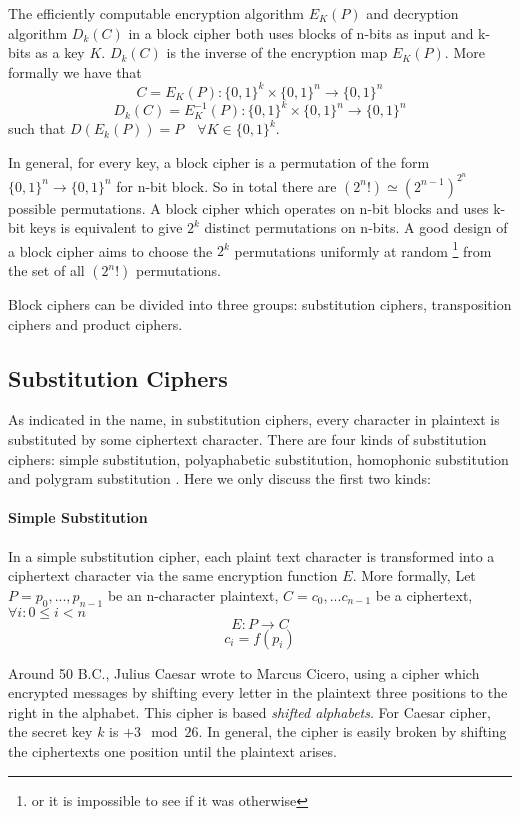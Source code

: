 The efficiently computable encryption algorithm $E_{K}(P)$ and decryption algorithm $D_{k}(C)$ in a block cipher both uses blocks of n-bits as input and k-bits as a key $K$. $D_{k}(C)$ is the inverse of the encryption map $E_{K}(P)$. More formally we have that $$C = E_{K}(P) : \{0,1\}^{k} \times \{0,1\}^{n} \rightarrow \{0,1\}^{n}$$
$$D_{k}(C) = E_{K}^{-1}(P) : \{0,1\}^{k} \times \{0,1\}^{n} \rightarrow \{0,1\}^{n}$$
such that $D(E_{k}(P)) = P \quad  \forall K \in \{0,1\}^k$. 

In general, for every key, a block cipher is a permutation of the form $\{0,1\}^{n} \rightarrow \{0,1\}^{n}$ for n-bit block. So in total there are $(2^{n}!) \simeq (2^{n-1})^{2^{n}}$ possible permutations. A block cipher which operates on n-bit blocks and uses k-bit keys is equivalent to give $2^{k}$ distinct permutations on n-bits. A good design of a block cipher aims to choose the $2^{k}$ permutations uniformly at random \footnote{or it is impossible to see if it was otherwise} from the set of all $(2^{n}!)$ permutations.

Block ciphers can be divided into three groups: substitution ciphers, transposition ciphers and product ciphers.
\subsection{Substitution Ciphers}
As indicated in the name, in substitution ciphers, every character in plaintext is substituted by some ciphertext character. There are four kinds of substitution ciphers: simple substitution, polyaphabetic substitution, homophonic substitution and polygram substitution \cite{knudsen1998block}. Here we only discuss the first two kinds:

\paragraph{Simple Substitution} 
In a simple substitution cipher, each plaint text character is transformed into a ciphertext character via the same encryption function $E$. More formally, Let $P = p_{0}, ... ,p_{n-1}$ be an n-character plaintext, $C=c_{0},...c_{n-1}$ be a ciphertext,  $\forall i : 0 \leq i < n $ 
$$ E : P \rightarrow C$$
$$c_{i} = f (p_{i})$$

Around 50 B.C., Julius Caesar wrote to Marcus Cicero, using a cipher which encrypted messages by shifting every letter in the plaintext three positions to the right in the alphabet. This cipher is based \textit{shifted alphabets}. For Caesar cipher, the secret key $k$ is $+3 \mod{26}$. In general, the cipher is easily broken by shifting the ciphertexts one position until the plaintext arises.
